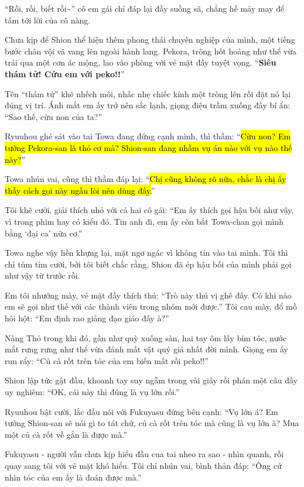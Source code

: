\documentclass[../main.tex]{subfiles}
\begin{document}
``Rồi, rồi, biết rồi\~{}'' cô em gái chỉ đáp lại đầy suồng sã, chẳng hề mảy may để tâm tới lời của cô nàng.

\ct

Chưa kịp để Shion thể hiện thêm phong thái chuyên nghiệp của mình, một tiếng bước chân vội vã vang lên ngoài hành lang. Pekora, trông hốt hoảng như thể vừa trải qua một cơn ác mộng, lao vào phòng với vẻ mặt đầy tuyệt vọng. ``\textbf{Siêu thám tử! Cứu em với peko!!}''

Tên ``thám tử'' khẽ nhếch môi, nhấc nhẹ chiếc kính một tròng lên rồi đặt nó lại đúng vị trí. Ánh mắt em ấy trở nên sắc lạnh, giọng điệu trầm xuống đầy bí ẩn: ``Sao thế, cừu non của ta?''

Ryuuhou ghé sát vào tai Towa đang đứng cạnh mình, thì thầm: ``\hl{Cừu non? Em tưởng Pekora-san là thỏ cơ mà? Shion-san đang nhầm vụ án nào với vụ nào thế này?}''

Towa nhún vai, cũng thì thầm đáp lại: ``\hl{Chị cũng không rõ nữa, chắc là chị ấy thấy cách gọi này ngầu lòi nên dùng đấy.}''

Tôi khẽ cười, giải thích nhỏ với cả hai cô gái: ``Em ấy thích gọi hậu bối như vậy, vì trong phim hay có kiểu đó. Tin anh đi, em ấy còn bắt Towa-chan gọi mình bằng `đại ca' nữa cơ.''

Towa nghe vậy liền khựng lại, mặt ngơ ngác vì không tin vào tai mình. Tôi thì chỉ tủm tỉm cười, bởi tôi biết chắc rằng, Shion đã ép hậu bối của mình phải gọi như vậy từ trước rồi.

Em tôi nhướng mày, vẻ mặt đầy thích thú: ``Trò này thú vị ghê đấy. Có khi nào em sẽ gọi như thế với các thành viên trong nhóm mới được.'' Tôi cau mày, đổ mồ hôi hột: ``Em định rao giảng đạo giáo đấy à?''

Nàng Thỏ trong khi đó, gần như quỳ xuống sàn, hai tay ôm lấy bím tóc, nước mắt rưng rưng như thể vừa đánh mất vật quý giá nhất đời mình. Giọng em ấy run rẩy: ``Củ cà rốt trên tóc của em biến mất rồi peko!!''


Shion lập tức gật đầu, khoanh tay suy ngẫm trong vài giây rồi phán một câu đầy uy nghiêm: ``OK, cái này thì đúng là vụ lớn rồi.''

Ryuuhou bật cười, lắc đầu nói với Fukuyasu đứng bên cạnh: ``Vụ lớn á? Em tưởng Shion-san sẽ nói gì to tát chứ, củ cà rốt trên tóc mà cũng là vụ lớn à? Mua một củ cà rốt về gắn là được mà.''

Fukuyasu - người vẫn chưa kịp hiểu đầu cua tai nheo ra sao - nhìn quanh, rồi quay sang tôi với vẻ mặt khó hiểu. Tôi chỉ nhún vai, bình thản đáp: ``Ông cứ nhìn tóc của em ấy là đoán được mà.''
\end{document}
